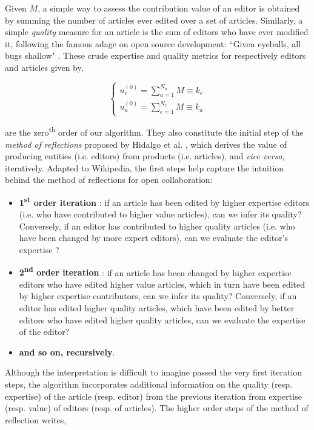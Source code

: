 Given $M$, a simple way to assess the contribution value of an editor is obtained by summing the number of articles ever edited over a set of articles. Similarly, a simple {\it quality} measure for an article is the sum of editors who have ever modified it, following the famous adage on open source development: ``Given eyeballs, all bugs shallow" \cite{raymond1999}. These crude expertise and quality metrics for respectively editors and articles given by,

\begin{equation}
\begin{cases}
 u_{e}^{(0)} = \sum_{a=1}^{N_{a}} M \equiv k_e\\[7pt]
 u_{a}^{(0)} = \sum_{e=1}^{N_{e}} M \equiv k_a
\end{cases}
\label{HHinit}
\end{equation}

are the zero\textsuperscript{th} order of our algorithm. They also constitute the initial step of the {\it method of reflections} proposed by Hidalgo et al. \cite{hidalgo2007,hidalgo2009}, which derives the value of producing entities (i.e. editors) from products (i.e. articles), and {\it vice versa}, iteratively. Adapted to Wikipedia, the first steps help capture the intuition behind the method of reflections for open collaboration:

\begin{itemize}
  \item {\bf 1\textsuperscript{st} order iteration} :  if an article has been edited by higher expertise editors (i.e. who have contributed to higher value articles), can we infer its quality? Conversely, if an editor has contributed to higher quality articles (i.e. who have been changed by more expert editors), can we evaluate the editor's expertise ?
  \item {\bf 2\textsuperscript{nd} order iteration} : if an article has been changed by higher expertise editors who have edited higher value articles, which in turn have been edited by higher expertise contributors, can we infer its quality? Conversely, if an editor has edited higher quality articles, which have been edited by better editors who have edited higher quality articles, can we evaluate the expertise of the editor?
 \item {\bf and so on, recursively}.\\
\end{itemize}

Although the interpretation is difficult to imagine passed the very first iteration steps, the algorithm incorporates additional information on the quality (resp. expertise) of the article (resp. editor) from the previous iteration from expertise (resp. value) of editors (resp. of articles). The higher order steps of the method of reflection writes,

